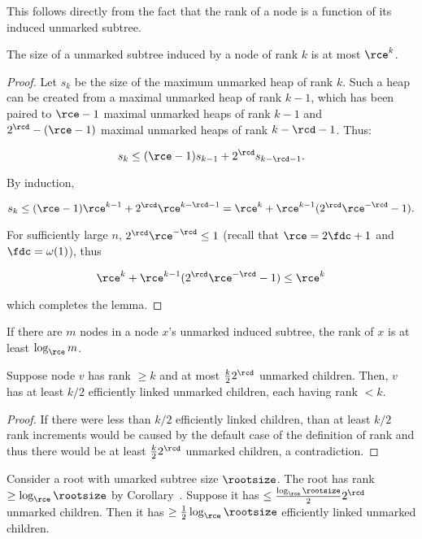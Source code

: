 This follows directly from the fact that the rank of a node is a function of its induced unmarked subtree.
\begin{fullonly}
\begin{lemma}The size of a unmarked subtree induced by a node of rank $k$ is at most $\rce ^k$.
\end{lemma}

\begin{proof}
Let $s_k$ be the size of the maximum unmarked heap of rank $k$. Such a heap can be created from a maximal unmarked heap of rank $k-1$, which has been paired to $\rce-1$ maximal unmarked heaps of rank $k-1$ and $2^{\rcd}{}-(\rce-1)$ maximal unmarked heaps of rank $k-\rcd-1$. Thus:


$$s_k \leq (\rce-1) s_{k-1}+2^{\rcd} s_{k-\rcd-1}.$$

By induction, 

$$s_k \leq (\rce-1) \rce ^{k-1}+2^{\rcd} \rce ^{k-\rcd-1}=
\rce ^{k} + \rce ^{k-1}(2^{\rcd} \rce ^{-\rcd}-1).$$ 

For sufficiently large $n$, $2^{\rcd} \rce ^{-\rcd}\leq 1$ (recall that $\rce=2 \fdc+1$ and $\fdc=\omega(1)$), thus

$$ \rce ^{k} + \rce ^{k-1}(2^{\rcd} \rce ^{-\rcd}-1)\leq  \rce ^{k} $$

which completes the lemma. 

\end{proof}

\begin{cor} 
If there are $m$ nodes in a node $x$'s unmarked induced subtree, the rank of $x$ is at least $\log_{\rce} {m} $.
\end{cor}


\begin{lemma}
Suppose node $v$ has rank $\geq k$ and at most $ \frac{k}{2}2^{\rcd} {}$ unmarked children. Then, $v$ has at least $k/2$ efficiently linked unmarked children, each having rank $<k$.
\end{lemma}


\begin{proof} If there were less than $k/2$ efficiently linked children, than at least $k/2$ rank increments would be caused by the default case of the definition of rank and thus there would be at least $\frac{k}{2}{2}^{\rcd} {}$ unmarked children, a contradiction.
\end{proof}


\begin{cor}
Consider a root with umarked subtree size $\rootsize$. 
The root has rank $\geq \log_{\rce } {\rootsize} $ by Corollary~. Suppose it has $\leq \frac{\log_{\rce }{\rootsize}}{2}2^{\rcd} {}  $ unmarked children. Then it has $\geq \frac{1}{2} \log_{\rce } \rootsize$ efficiently linked unmarked children.
\end{cor}


\end{fullonly}
